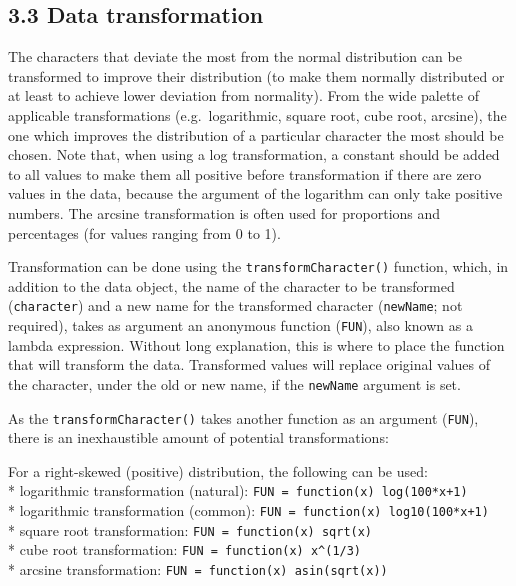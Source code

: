 \documentclass[
]{article}
\begin{document}
\hypertarget{data-transformation}{%
\subsection{3.3 Data transformation}\label{data-transformation}}

The characters that deviate the most from the normal distribution can be
transformed to improve their distribution (to make them normally
distributed or at least to achieve lower deviation from normality). From
the wide palette of applicable transformations (e.g.~logarithmic, square
root, cube root, arcsine), the one which improves the distribution of a
particular character the most should be chosen. Note that, when using a
log transformation, a constant should be added to all values to make
them all positive before transformation if there are zero values in the
data, because the argument of the logarithm can only take positive
numbers. The arcsine transformation is often used for proportions and
percentages (for values ranging from 0 to 1).

Transformation can be done using the \texttt{transformCharacter()}
function, which, in addition to the data object, the name of the
character to be transformed (\texttt{character}) and a new name for the
transformed character (\texttt{newName}; not required), takes as
argument an anonymous function (\texttt{FUN}), also known as a lambda
expression. Without long explanation, this is where to place the
function that will transform the data. Transformed values will replace
original values of the character, under the old or new name, if the
\texttt{newName} argument is set.

As the \texttt{transformCharacter()} takes another function as an
argument (\texttt{FUN}), there is an inexhaustible amount of potential
transformations:

For a right-skewed (positive) distribution, the following can be used:\\
* logarithmic transformation (natural):
\texttt{FUN\ =\ function(x)\ log(100*x+1)}\\
* logarithmic transformation (common):
\texttt{FUN\ =\ function(x)\ log10(100*x+1)}\\
* square root transformation: \texttt{FUN\ =\ function(x)\ sqrt(x)}\\
* cube root transformation: \texttt{FUN\ =\ function(x)\ x\^{}(1/3)}\\
* arcsine transformation: \texttt{FUN\ =\ function(x)\ asin(sqrt(x))}
\end{document}
